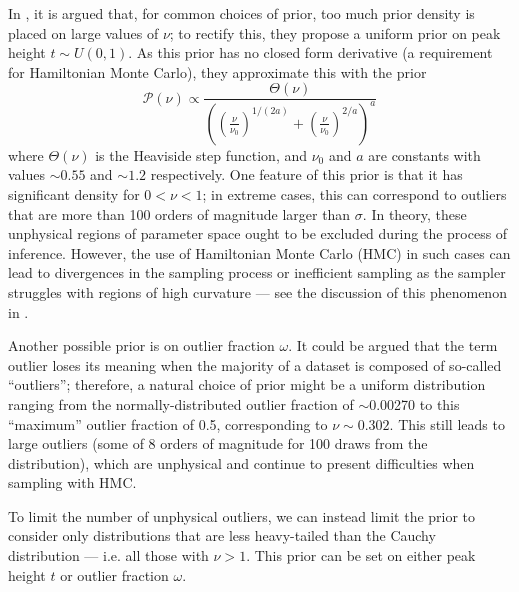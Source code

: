 \documentclass[fleqn,usenatbib]{mnras}
\begin{document}
In \citet{Feeney:2018}, it is argued that, for common choices of prior, too
much prior density is placed on large values of $\nu$; to rectify this, they
propose a uniform prior on peak height $t \sim U\left(0, 1\right)$. As this
prior has no closed form derivative (a requirement for Hamiltonian Monte Carlo),
they approximate this with the prior
\begin{equation}
    \mathcal P\left(\nu\right) \propto
    \frac{
        \Theta(\nu)
    }{
        \left(
            \left(\frac{\nu}{\nu_0}\right)^{1 / (2 a)}
            + \left(\frac{\nu}{\nu_0}\right)^{2 / a}
        \right)^a
    }
\end{equation}
where $\Theta(\nu)$ is the Heaviside step function, and $\nu_0$ and $a$ are
constants with values $\sim 0.55$ and $\sim 1.2$ respectively.  One feature of
this prior is that it has significant density for $0 < \nu < 1$; in extreme
cases, this can correspond to outliers that are more than 100 orders of
magnitude larger than $\sigma$. In theory, these unphysical regions of parameter
space ought to be excluded during the process of inference. However, the use of
Hamiltonian Monte Carlo (HMC) in such cases can lead to divergences in the
sampling process or inefficient sampling as the sampler struggles with regions
of high curvature --- see the discussion of this phenomenon in
\citet{Neal:2003}.

Another possible prior is on outlier fraction $\omega$. It could be argued that
the term outlier loses its meaning when the majority of a dataset is composed of
so-called ``outliers''; therefore, a natural choice of prior might be a uniform
distribution ranging from the normally-distributed outlier fraction of
$\sim$0.00270 to this ``maximum'' outlier fraction of 0.5, corresponding to $\nu
\sim 0.302$. This still leads to large outliers (some of 8 orders of magnitude
for 100 draws from the distribution), which are unphysical and continue to
present difficulties when sampling with HMC.

To limit the number of unphysical outliers, we can instead limit the prior to
consider only distributions that are less heavy-tailed than the Cauchy
distribution --- i.e. all those with $\nu > 1$. This prior can be set on either
peak height $t$ or outlier fraction $\omega$.

\end{document}

